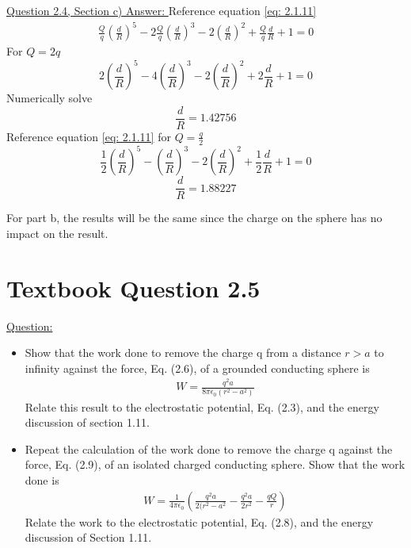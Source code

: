 \documentclass[12pt]{article}
\begin{document}
    \underline{Question 2.4, Section c) Answer: }
    \newline Reference equation \ref{eq: 2.1.11}
    \begin{gather*}
        \frac{Q}{q} \left(\frac{d}{R} \right)^5 - 2 \frac{Q}{q} \left(\frac{d}{R} \right)^3 - 2 \left(\frac{d}{R} \right)^2 + \frac{Q}{q} \frac{d}{R} + 1 = 0
    \end{gather*}
    For $Q = 2q$
    \begin{equation} \label{eq: 2.3.1}
        2 \left(\frac{d}{R} \right)^5 - 4 \left(\frac{d}{R} \right)^3 - 2 \left(\frac{d}{R} \right)^2 + 2 \frac{d}{R} + 1 = 0
    \end{equation}
    Numerically solve
    \begin{equation} \label{eq: 2.3.2}
        \frac{d}{R} = 1.42756
    \end{equation}
    Reference equation \ref{eq: 2.1.11} for $Q = \frac{q}{2}$
    \begin{equation} \label{eq: 2.3.3}
        \frac{1}{2} \left(\frac{d}{R} \right)^5 - \left(\frac{d}{R} \right)^3 - 2 \left(\frac{d}{R} \right)^2 + \frac{1}{2} \frac{d}{R} + 1 = 0
    \end{equation}
    \begin{equation} \label{eq: 2.3.4}
        \frac{d}{R} = 1.88227
    \end{equation}

    For part b, the results will be the same since the charge on the sphere has no impact on the result. 
    
\newpage
\section{Textbook Question 2.5} \label{section3}
    \underline{Question: }
    \begin{itemize}
        \item [a)] Show that the work done to remove the charge q from a distance $r>a$ to infinity against the force, Eq. (2.6), of a grounded conducting sphere is \begin{gather*} W=\frac{q^2 a}{8 \pi \epsilon_0 (r^2 - a^2)} \end{gather*} Relate this result to the electrostatic potential, Eq. (2.3), and the energy discussion of section 1.11. 
        \item [b)] Repeat the calculation of the work done to remove the charge q against the force, Eq. (2.9), of an isolated charged conducting sphere. Show that the work done is \begin{gather*} W = \frac{1}{4 \pi \epsilon_0} \left(\frac{q^2 a}{2 (r^2 - a^2} - \frac{q^2 a}{2 r^2} - \frac{q Q}{r} \right) \end{gather*}  Relate the work to the electrostatic potential, Eq. (2.8), and the energy discussion of Section 1.11.
    \end{itemize}
\end{document}
